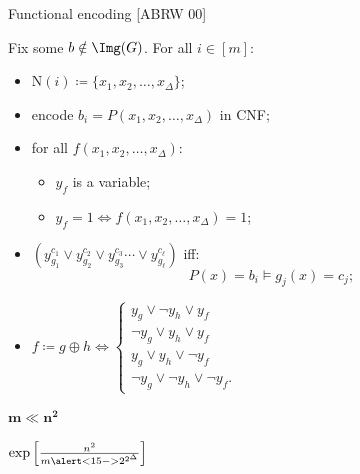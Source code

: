 \begin{frame}{Functional encoding [ABRW 00]}
    
    \pause
    \begin{minipage}{0.38\linewidth}
        \centering
        
    \end{minipage}
    \begin{minipage}{0.58\linewidth}
        Fix some $b \notin \Img(G)$. For all $i \in [m]$:
        \begin{itemize}
            \item $\mathrm{N}(i) \coloneqq \{x_1, x_2, \dots, x_{\Delta}\}$;
                \pause
            \item encode $b_i = P(x_1, x_2, \dots, x_{\Delta})$ in CNF;
                \pause
            \item for all $f(x_1, x_2, \dots, x_{\Delta})$:
                \begin{itemize}
                    \item $y_f$ is a variable;
                    \item $y_f = 1 \Leftrightarrow f(x_1, x_2, \dots, x_{\Delta}) = 1$;
                \end{itemize}
                \pause
            \item $(y_{g_1}^{c_1} \lor y_{g_2}^{c_2} \lor y_{g_3}^{c_3} \cdots \lor
                y_{g_\ell}^{c_{\ell}})$ iff:
                $$
                    P(x) = b_i \models g_j(x) = c_j;
                $$
            \item  \pause $f \coloneqq g \oplus h \Leftrightarrow
                \begin{cases}
                    y_g \lor \neg y_h \lor y_f \\
                    \neg y_g \lor y_h \lor y_f \\
                    y_g \lor y_h \lor \neg y_f \\
                    \neg y_g \lor \neg y_h \lor \neg y_f.
                \end{cases}$
        \end{itemize}
    \end{minipage}

    \pause
    \vspace{0.2cm}
    \begin{minipage}[t][3cm][t]{0.32\linewidth}
        \centering
        $\mathbf{m \ll n^2}$

        \pause
        \vspace{0.2cm}
        $\exp\left[\frac{n^2}{m \alert<15->{2^{2^{\Delta}}}} \right]$


\end{minipage}
\end{frame}
